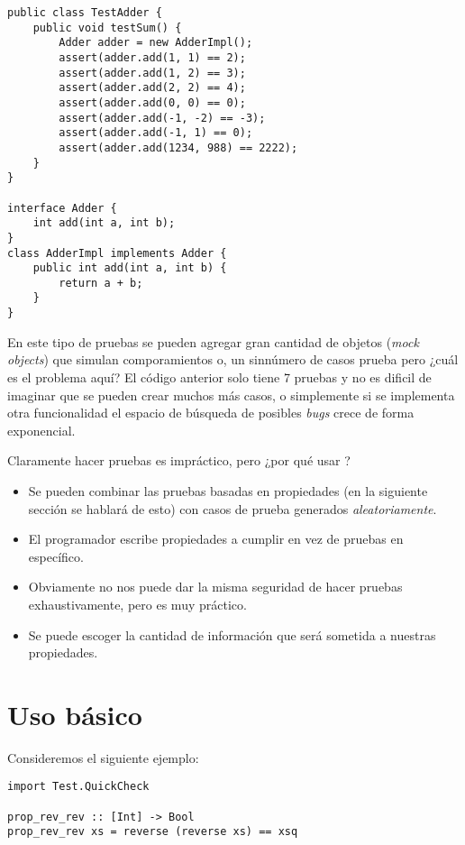 \begin{verbatim}
public class TestAdder {
    public void testSum() {
        Adder adder = new AdderImpl();
        assert(adder.add(1, 1) == 2);
        assert(adder.add(1, 2) == 3);
        assert(adder.add(2, 2) == 4);
        assert(adder.add(0, 0) == 0);
        assert(adder.add(-1, -2) == -3);
        assert(adder.add(-1, 1) == 0);
        assert(adder.add(1234, 988) == 2222);
    }
}

interface Adder {
    int add(int a, int b);
}
class AdderImpl implements Adder {
    public int add(int a, int b) {
        return a + b;
    }
}
\end{verbatim}

En este tipo de pruebas se pueden agregar gran cantidad de objetos (\textit{mock objects}) que
simulan comporamientos o, un sinnúmero de casos prueba pero ¿cuál es el problema aquí? El código
anterior solo tiene 7 pruebas y no es dificil de imaginar que se pueden crear muchos más casos, o
simplemente si se implementa otra funcionalidad el espacio de búsqueda de posibles \textit{bugs}
crece de forma exponencial.

Claramente hacer pruebas es impráctico, pero ¿por qué usar \QuickCheck?
\begin{itemize}
\item Se pueden combinar las pruebas basadas en propiedades (en la siguiente sección se hablará
de esto) con casos de prueba generados \textit{aleatoriamente}.
\item El programador escribe propiedades a cumplir en vez de pruebas en específico.
\item Obviamente no nos puede dar la misma seguridad de hacer pruebas exhaustivamente, pero
es muy práctico.
\item Se puede escoger la cantidad de información que será sometida a nuestras propiedades.
\end{itemize}


\newpage
\section{Uso básico}
Consideremos el siguiente ejemplo:
\begin{verbatim}
import Test.QuickCheck

prop_rev_rev :: [Int] -> Bool
prop_rev_rev xs = reverse (reverse xs) == xsq
\end{verbatim}

